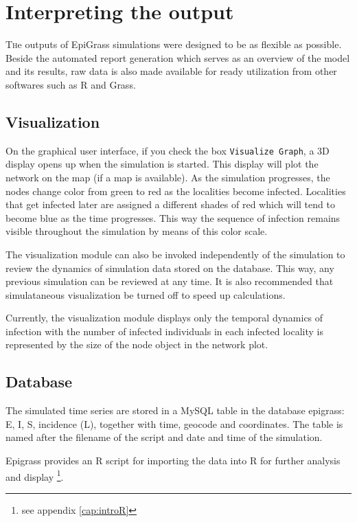 \chapter{Interpreting the output}   \label{cap:analysis}
\lettrine{T}he outputs of EpiGrass simulations were designed to be as flexible as possible. Beside the automated report generation which serves as an overview of the model and its results, raw data is also made available for ready utilization from other softwares such as R and Grass.

\section{Visualization}

On the graphical user interface, if you check the box \texttt{Visualize Graph}, a 3D display opens up when the simulation is started. This display will plot the network on the map (if a map is available). As the simulation progresses, the nodes  change color from green to red as the localities become infected. Localities that get infected later are assigned a different shades of red which will tend to become blue as the time progresses. This way the sequence of infection remains visible throughout the simulation by means of this color scale.

The visualization module can also be invoked independently of the simulation to review the dynamics of simulation data stored on the database. This way, any previous simulation can be reviewed at any time. It is also recommended that simulataneous visualization be turned off to speed up calculations.  

Currently, the visualization module displays only the temporal dynamics of infection with the number of infected individuals in each infected locality is represented by the size of the node object in the network plot. 

\section{Database}
The simulated time series are stored in a MySQL table in the database epigrass: E, I, S, incidence (L), together with time, geocode and coordinates. The table is named after the filename of the script and date and time of the simulation.

Epigrass provides an R script for importing the data into R for further analysis and display \footnote{see appendix \ref{cap:introR}}.     

